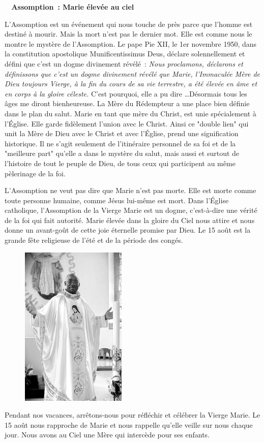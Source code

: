 \begin{center}
 \textbf{
\og 
Assomption : Marie élevée au ciel
 \fg{}
 }
 \end{center}

L'Assomption est un événement qui nous touche de près parce que l'homme est destiné à mourir. Mais la mort n'est pas le dernier mot.
Elle est comme nous le montre le mystère de l'Assomption. Le pape Pie XII, le 1er novembre 1950, dans la constitution apostolique \og Munificentissimus Deus\fg{}, déclare solennellement et défini que c'est un dogme divinement révélé :
\emph{\og Nous proclamons, déclarons et définissons que c'est un dogme divinement révélé que Marie, l'Immaculée Mère de Dieu toujours Vierge, à la fin du cours de sa vie terrestre, a été élevée en âme et en corps à la gloire céleste.\fg{}}
C’est pourquoi, elle a pu dire \og \dots Désormais tous les âges me diront bienheureuse\fg{}.
La Mère du Rédempteur a une place bien définie dans le plan du salut. Marie en tant que mère du Christ, est unie spécialement à l’Église. Elle garde fidèlement l’union avec le Christ. Ainsi ce "double lien" qui unit la Mère de Dieu avec le Christ et avec l’Église, prend une signification historique.
Il ne s’agit seulement de l’itinéraire personnel de sa foi et de la "meilleure part" qu’elle a dans le mystère du salut, mais aussi et surtout de l’histoire de tout le peuple de Dieu, de tous ceux qui participent au même pèlerinage de la foi.

L’Assomption ne veut pas dire que Marie n’est pas morte. Elle est morte comme toute personne humaine, comme Jésus lui-même est mort. Dans l'Église catholique, l'Assomption de la Vierge Marie est un dogme, c'est-à-dire une vérité de la foi qui fait autorité.
Marie élevée dans la gloire du Ciel nous attire et nous donne un avant-goût de cette joie éternelle promise par Dieu. Le 15 août est la grande fête religieuse de l'été et de la période des congés.
\begin{figure}
\vspace{-0.4cm}
	\includegraphics[scale=1.20]{../images/standing_daniel}
\end{figure}
Pendant nos vacances, arrêtons-nous pour réfléchir et célébrer la Vierge Marie.
Le 15 août nous rapproche de Marie et nous rappelle qu'elle veille sur nous chaque jour. Nous avons au Ciel une Mère qui intercède pour ses enfants.

